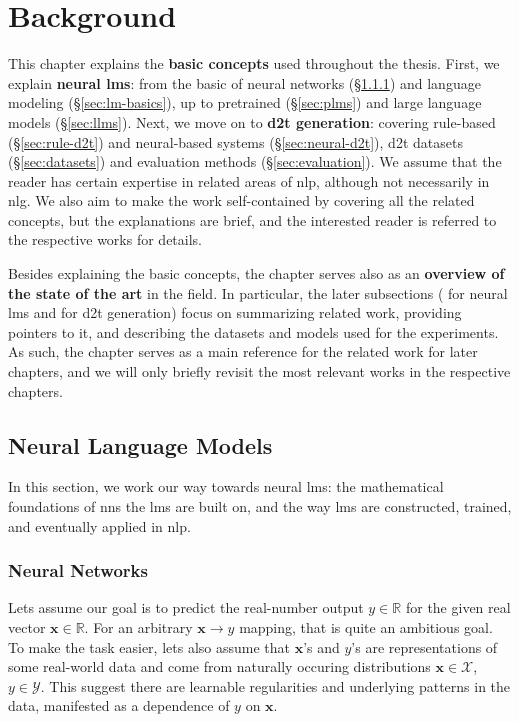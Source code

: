 
\chapter{Background}
\label{chap:background}

This chapter explains the \textbf{basic concepts} used throughout the thesis. First, we explain \textbf{neural \acp{lm}}: from the basic of neural networks (§\ref{sec:nns}) and language modeling (§\ref{sec:lm-basics}), up to pretrained (§\ref{sec:plms}) and large language models (§\ref{sec:llms}). Next, we move on to \textbf{\ac{d2t} generation}: covering rule-based (§\ref{sec:rule-d2t}) and neural-based systems (§\ref{sec:neural-d2t}), \ac{d2t} datasets (§\ref{sec:datasets}) and evaluation methods (§\ref{sec:evaluation}). We assume that the reader has certain expertise in related areas of \ac{nlp}, although not necessarily in \ac{nlg}. We also aim to make the work self-contained by covering all the related concepts, but the explanations are brief, and the interested reader is referred to the respective works for details.

Besides explaining the basic concepts, the chapter serves also as an \textbf{overview of the state of the art} in the field. In particular, the later subsections ( for neural \acp{lm} and  for \ac{d2t} generation) focus on summarizing related work, providing pointers to it, and describing the datasets and models used for the experiments. As such, the chapter serves as a main reference for the related work for later chapters, and we will only briefly revisit the most relevant works in the respective chapters.


\section{Neural Language Models}
\label{sec:lms}
In this section, we work our way towards neural \acp{lm}: the mathematical foundations of \acp{nn} the \acp{lm} are built on, and the way \acp{lm} are constructed, trained, and eventually applied in \ac{nlp}.

\subsection{Neural Networks}
\label{sec:nns}
Lets assume our goal is to predict the real-number output $y \in \mathbb{R}$ for the given real vector $\mathbf{x} \in \mathbb{R}$. For an arbitrary $\mathbf{x} \rightarrow y$ mapping, that is quite an ambitious goal. To make the task easier, lets also assume that $\mathbf{x}$'s and $y$'s are representations of some real-world data and come from naturally occuring distributions $\mathbf{x} \in \mathcal{X}$, $y \in \mathcal{Y}$. This suggest there are learnable regularities and underlying patterns in the data, manifested as a dependence of $y$ on $\mathbf{x}$.

